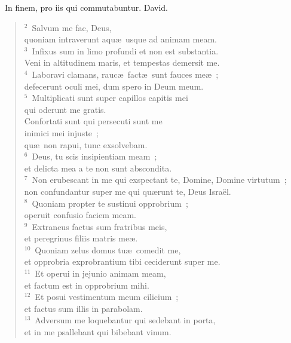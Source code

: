 ~\lettrine[lines=10,image=true,loversize=0.05,lraise=-0.03]{I}{}n finem, pro iis qui commutabuntur. David.
\begin{flushleft}\begin{verse}\vspace{6pt}${}^{2}$~Salvum me fac, Deus,\\ quoniam intraverunt aqu\ae\ usque ad animam meam.\\
${}^{3}$~Infixus sum in limo profundi et non est substantia.\\ Veni in altitudinem maris, et tempestas demersit me.\\
${}^{4}$~Laboravi clamans, rauc\ae\ fact\ae\ sunt fauces me\ae~;\\ defecerunt oculi mei, dum spero in Deum meum.\\
${}^{5}$~Multiplicati sunt super capillos capitis mei\\ qui oderunt me gratis.\\ Confortati sunt qui persecuti sunt me\\ inimici mei injuste~;\\ qu\ae\ non rapui, tunc exsolvebam.\\
${}^{6}$~Deus, tu scis insipientiam meam~;\\ et delicta mea a te non sunt abscondita.\\
${}^{7}$~Non erubescant in me qui exspectant te, Domine, Domine virtutum~;\\ non confundantur super me qui qu\ae runt te, Deus Isra\"el.\\
${}^{8}$~Quoniam propter te sustinui opprobrium~;\\ operuit confusio faciem meam.\\
${}^{9}$~Extraneus factus sum fratribus meis,\\ et peregrinus filiis matris me\ae .\\
${}^{10}$~Quoniam zelus domus tu\ae\ comedit me,\\ et opprobria exprobrantium tibi ceciderunt super me.\\
${}^{11}$~Et operui in jejunio animam meam,\\ et factum est in opprobrium mihi.\\
${}^{12}$~Et posui vestimentum meum cilicium~;\\ et factus sum illis in parabolam.\\
${}^{13}$~Adversum me loquebantur qui sedebant in porta,\\ et in me psallebant qui bibebant vinum.\\

\end{verse}
\end{flushleft}
